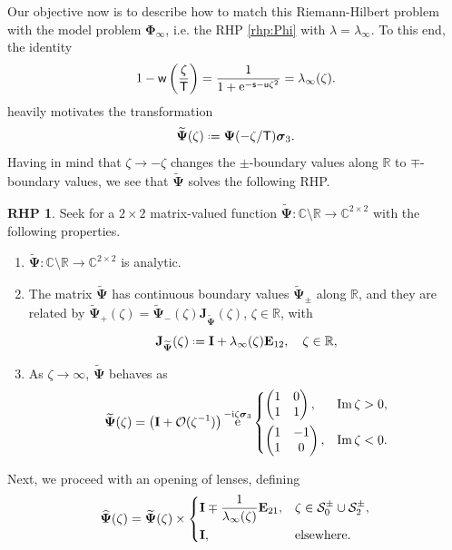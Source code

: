 \documentclass[reqno,a4paper,11pt]{amsart}
\DeclareMathOperator{\im}{Im}
\DeclareMathOperator{\ee}{\rm e}
\newcommand{\C}{\mathbb{C}}
\newcommand{\R}{\mathbb{R}}
\newcommand{\Boh}{\mathcal{O}}
\newcommand{\ii}{\mathrm{i}}
\newcommand*{\deff}{\mathrel{\vcenter{\baselineskip0.5ex \lineskiplimit0pt
                     \hbox{\scriptsize.}\hbox{\scriptsize.}}}%
                     =}
\renewcommand{\bm}{\mathbf}
\newcommand{\mcal}{\mathcal}
\newcommand{\msf}{\mathsf}
\newcommand{\wh}{\widehat}
\newcommand{\wt}{\widetilde}
\renewcommand{\sp}{\boldsymbol \sigma}
\newcommand{\sad}{\msf s}
\newcommand{\uad}{\msf u}
\theoremstyle{definition}
\newtheorem{rhp}[theorem]{RHP}
\theoremstyle{remark}
\numberwithin{equation}{section}
\begin{document}
Our objective now is to describe how to match this Riemann-Hilbert problem with the model problem $\bm \Phi_\infty$, i.e. the RHP \ref{rhp:Phi} with $\lambda =\lambda_\infty$. To this end, the identity
%
\begin{equation}\label{eq:wlambdainfty}
1-\msf w\left(\frac{\zeta}{\msf T} \right)
    = \frac{1}{1+\ee^{-\sad-\uad\zeta^2}} = \lambda_\infty(\zeta).
\end{equation}
%
heavily motivates the transformation 
%
$$
\wt {\bm{\Psi}}(\zeta)\deff \bm \Psi(-\zeta/\msf T)\sp_3.
$$
%
Having in mind that $\zeta\to -\zeta$ changes the $\pm$-boundary values along $\R$ to $\mp$-boundary values, we see that $\wt{\bm \Psi}$ solves the following RHP.
%
\begin{rhp} Seek for a $2\times 2$ matrix-valued function $\wt{\bm \Psi}:\C\setminus \R\to \C^{2\times 2}$ with the following properties.
\begin{enumerate}[\rm (i)]
\item $\wt{\bm \Psi}:\C\setminus \R\to \C^{2\times 2}$ is analytic.
\item The matrix $\wt{\bm \Psi}$ has continuous boundary values $\wt{\bm \Psi}_\pm$ along $\R$, and they are related by $\wt{\bm \Psi}_+(\zeta)=\wt{\bm \Psi}_-(\zeta)\bm J_{\wt{\bm \Psi}}(\zeta)$, $\zeta\in \R$, with
%
$$
\bm J_{\wt{\bm \Psi}}(\zeta)\deff 
    \bm I+\lambda_\infty(\zeta)\bm E_{12},\quad \zeta \in \R,
$$
%
\item As $\zeta\to \infty$, $\wt{\bm \Psi}$ behaves as
%
$$
\wt{\bm \Psi}(\zeta)=\left(\bm I+\Boh(\zeta^{-1})\right) \ee^{-\ii \zeta\sp_3}
\begin{dcases}
\begin{pmatrix}
    1 & 0\\ 1 & 1
\end{pmatrix}, & \im\zeta>0, \\ 
\begin{pmatrix}
    1 & -1\\ 1 & 0
\end{pmatrix}, & \im\zeta<0.
\end{dcases}
$$

\end{enumerate}
\end{rhp}

Next, we proceed with an opening of lenses, defining
%
$$
\wh{\bm \Psi}(\zeta)=\wt{\bm \Psi}(\zeta)\times 
\begin{dcases}
    \bm I\mp \frac{1}{\lambda_\infty(\zeta)}\bm E_{21}, & \zeta\in \mcal S_0^\pm\cup \mcal S_2^\pm, \\ 
    \bm I, & \text{elsewhere}.
\end{dcases}
$$
\end{document}
